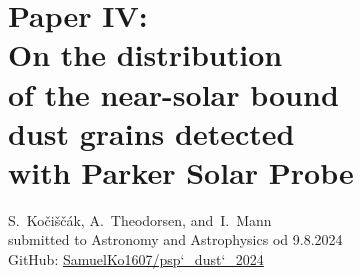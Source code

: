 \documentclass[11pt,twoside,openright]{book}
\begin{document}
\chapter[Paper IV: On the distribution of the near-solar bound dust grains detected with Parker Solar Probe]{Paper IV:\\On the distribution\\of the near-solar bound\\dust grains detected\\with Parker Solar Probe}
S.~Ko{\v{c}}i{\v{s}}{\v{c}}{\'a}k, A.~Theodorsen, and~I.~Mann\\
submitted to Astronomy and Astrophysics od 9.8.2024\\
GitHub: \href{https://zenodo.org/records/13284890}{SamuelKo1607/psp\char`_dust\char`_2024}\\
\newpage\null\newpage





\end{document}
